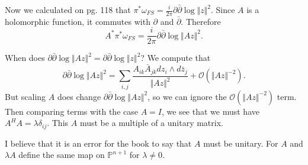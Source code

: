 \documentclass[10pt,letter]{article}
\begin{document}
Now we calculated on pg. 118 that $\pi^{\ast} \omega_{FS}= \frac{i}{2\pi} \partial \bar{\partial} \log \Vert z \Vert^2$. Since $A$ is a holomorphic function, it commutes with $\partial$ and $\bar{\partial}$. Therefore \[ A^{\ast}  \pi^{\ast} \omega_{FS} =  \frac{i}{2\pi} \partial \bar{\partial} \log \Vert Az \Vert^2.\]

When does $\partial \bar{\partial} \log \Vert Az \Vert^2 = \partial \bar{\partial} \log \Vert z \Vert^2$? We compute that
\[ \partial \bar{\partial}\log \Vert Az \Vert^2 = \sum_{i,j} \frac{A_{ik}\bar{A}_{jk} dz_i \wedge d\bar{z}_j}{\Vert Az \Vert^2} + \mathcal{O}(\Vert Az \Vert^{-2}).\]
But scaling $A$ does change $\partial \bar{\partial} \log \Vert Az \Vert^2$, so we can ignore the $\mathcal{O}(\Vert Az \Vert^{-2})$ term. Then comparing terms with the case $A = I$, we see that we must have $A^HA = \lambda \delta_{ij}$. This $A$ must be a multiple of a unitary matrix. 

I believe that it is an error for the book to say that $A$ must be unitary. For $A$ and $\lambda A$ define the same map on $\mathbb{P}^{n+1}$ for $\lambda \neq 0$. 
\end{document}
